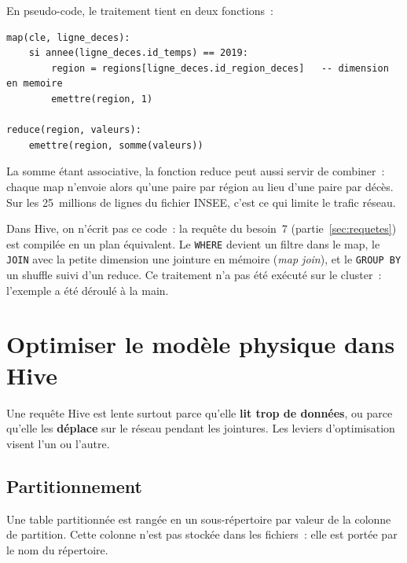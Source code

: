 \noindent En pseudo-code, le traitement tient en deux fonctions~:

\begin{center}
\begin{minipage}{0.92\textwidth}
\begin{tcolorbox}[colback=title2!6,colframe=title1,boxsep=2pt]
\begin{verbatim}
map(cle, ligne_deces):
    si annee(ligne_deces.id_temps) == 2019:
        region = regions[ligne_deces.id_region_deces]   -- dimension en memoire
        emettre(region, 1)

reduce(region, valeurs):
    emettre(region, somme(valeurs))
\end{verbatim}
\end{tcolorbox}
\end{minipage}
\end{center}

\noindent La somme étant associative, la fonction reduce peut aussi servir de combiner~: chaque map n'envoie alors qu'une paire par région au lieu d'une paire par décès. Sur les 25~millions de lignes du fichier INSEE, c'est ce qui limite le trafic réseau.

\vspace{0.2cm}

\noindent Dans Hive, on n'écrit pas ce code~: la requête du besoin~7 (partie~\ref{sec:requetes}) est compilée en un plan équivalent. Le \texttt{WHERE} devient un filtre dans le map, le \texttt{JOIN} avec la petite dimension une jointure en mémoire (\textit{map join}), et le \texttt{GROUP BY} un shuffle suivi d'un reduce. Ce traitement n'a pas été exécuté sur le cluster~: l'exemple a été déroulé à la main.

\newpage
\section{Optimiser le modèle physique dans Hive}

\noindent Une requête Hive est lente surtout parce qu'elle \textbf{lit trop de données}, ou parce qu'elle les \textbf{déplace} sur le réseau pendant les jointures. Les leviers d'optimisation visent l'un ou l'autre.

\subsection{Partitionnement}

\noindent Une table partitionnée est rangée en un sous-répertoire par valeur de la colonne de partition. Cette colonne n'est pas stockée dans les fichiers~: elle est portée par le nom du répertoire.

